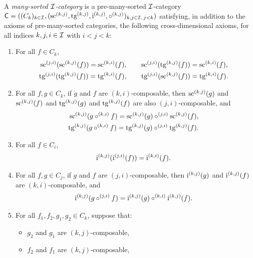 \begin{definition}
  \label{def:ManySortedCategory}
  \leanok
  A \emph{many-sorted $\mathcal{I}$-category} is a pre-many-sorted $\mathcal{I}$-category $\mathsf{C} = ((C_k)_{k
  \in \mathcal{I}}, (\operatorname{sc}^{(k,j)}, \operatorname{tg}^{(k,j)}, \operatorname{i}^{(k,j)}, \circ^{(k,j)})_{k, j \in \mathcal{I}, \, j < k})$
  satisfying, in addition to the axioms of pre-many-sorted categories, the following
  cross-dimensional axioms, for all indices $k, j, i \in \mathcal{I}$ with $i < j < k$:

  \begin{enumerate}
    \item \label{ax:ms_cross_glob} For all $f \in C_k$,
      \begin{align*}
        \operatorname{sc}^{(j,i)} (\operatorname{sc}^{(k,j)} (f)) = \operatorname{sc}^{(k,i)} (f), \qquad &
        \operatorname{sc}^{(j,i)} (\operatorname{tg}^{(k,j)} (f)) = \operatorname{sc}^{(k,i)} (f), \\
        \operatorname{tg}^{(j,i)} (\operatorname{tg}^{(k,j)} (f)) = \operatorname{tg}^{(k,i)} (f), \qquad &
        \operatorname{tg}^{(j,i)} (\operatorname{sc}^{(k,j)} (f)) = \operatorname{tg}^{(k,i)} (f).
      \end{align*}
    \item \label{ax:ms_cross_sc_tg_comp} For all $f, g \in C_k$, if $g$ and $f$ are
      $(k,i)$-composable, then $\operatorname{sc}^{(k,j)} (g)$ and $\operatorname{sc}^{(k,j)} (f)$ and $\operatorname{tg}^{(k,j)} (g)$ and
      $\operatorname{tg}^{(k,j)} (f)$ are also $(j,i)$-composable, and
      \begin{align*}
        \operatorname{sc}^{(k,j)} (g \circ^{(k,i)} f) = \operatorname{sc}^{(k,j)} (g) \circ^{(j,i)} \operatorname{sc}^{(k,j)} (f), \\
        \operatorname{tg}^{(k,j)} (g \circ^{(k,i)} f) = \operatorname{tg}^{(k,j)} (g) \circ^{(j,i)} \operatorname{tg}^{(k,j)} (f).
      \end{align*}
    \item \label{ax:ms_idm_idm} For all $f \in C_i$,
      \[
        \operatorname{i}^{(k,j)} (\operatorname{i}^{(j,i)} (f)) = \operatorname{i}^{(k,i)} (f).
      \]
    \item \label{ax:ms_idm_comp} For all $f, g \in C_j$, if $g$ and $f$ are $(j,i)$-composable, then
      $\operatorname{i}^{(k,j)} (g)$ and $\operatorname{i}^{(k,j)} (f)$ are $(k,i)$-composable, and
      \[
        \operatorname{i}^{(k,j)} (g \circ^{(j,i)} f) = \operatorname{i}^{(k,j)} (g) \circ^{(k,i)} \operatorname{i}^{(k,j)} (f).
      \]
    \item \label{ax:ms_interchange} For all $f_1, f_2, g_1, g_2 \in C_k$, suppose that:
      \begin{itemize}
        \item $g_2$ and $g_1$ are $(k,j)$-composable,
        \item $f_2$ and $f_1$ are $(k,j)$-composable,

\end{itemize}
\end{enumerate}
\end{definition}
